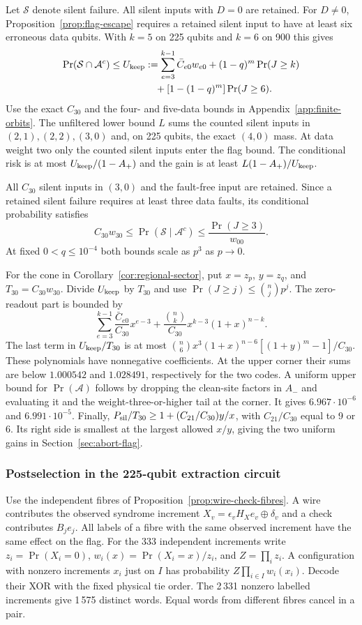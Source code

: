 \documentclass[10pt,twocolumn]{article}
\theoremstyle{definition}
\begin{document}
Let $\mathcal S$ denote silent failure. All silent inputs with
$D=0$ are retained. For $D\ne0$, Proposition~\ref{prop:flag-escape}
requires a retained silent input to have at least six erroneous data
qubits. With $k=5$ on 225 qubits and $k=6$ on 900 this gives
\begin{align*}
 \Pr(\mathcal S\cap\mathcal A^c)\le U_{\rm keep}
 &:=\sum_{e=3}^{k-1}\bar C_{e0}w_{e0}
       +(1-q)^m\Pr(J\ge k)\\
 &\quad+[1-(1-q)^m]\Pr(J\ge6).
\end{align*}
Use the exact $C_{30}$ and the four- and five-data bounds in
Appendix~\ref{app:finite-orbits}. The unfiltered lower bound $L$
sums the counted silent inputs in $(2,1),(2,2),(3,0)$ and, on 225
qubits, the exact $(4,0)$ mass. At data weight two only the counted
silent inputs enter the flag bound. The conditional risk is at most
$U_{\rm keep}/(1-A_+)$ and the gain is at least $L(1-A_+)/U_{\rm keep}$.

All $C_{30}$ silent inputs in $(3,0)$ and the fault-free input are
retained. Since a retained silent failure requires at least three
data faults, its conditional probability satisfies
\[
 C_{30}w_{30}\le\Pr(\mathcal S\mid\mathcal A^c)
 \le\frac{\Pr(J\ge3)}{w_{00}}.
\]
At fixed $0<q\le10^{-4}$ both bounds scale as $p^3$ as $p\to0$.

For the cone in Corollary~\ref{cor:regional-sector}, put $x=z_p$,
$y=z_q$, and $T_{30}=C_{30}w_{30}$. Divide $U_{\rm keep}$ by $T_{30}$
and use $\Pr(J\ge j)\le\binom njp^j$. The zero-readout part is bounded by
\[
 \sum_{e=3}^{k-1}\frac{\bar C_{e0}}{C_{30}}x^{e-3}
 +\frac{\binom nk}{C_{30}}x^{k-3}(1+x)^{n-k}.
\]
The last term in $U_{\rm keep}/T_{30}$ is at most
$\binom n6 x^3(1+x)^{n-6}[(1+y)^m-1]/C_{30}$.
These polynomials have nonnegative coefficients. At the upper corner
their sums are below $1.000542$ and $1.028491$, respectively for
the two codes. A uniform upper bound for $\Pr(\mathcal A)$ follows by
dropping the clean-site factors in $A_-$ and evaluating it and the
weight-three-or-higher tail at the corner. It gives $6.967\cdot10^{-6}$
and $6.991\cdot10^{-5}$. Finally,
$P_{\rm sil}/T_{30}\ge1+(C_{21}/C_{30})y/x$, with $C_{21}/C_{30}$
equal to 9 or 6. Its right side is smallest at the largest allowed
$x/y$, giving the two uniform gains in Section~\ref{sec:abort-flag}.

\subsubsection{Postselection in the 225-qubit extraction circuit}\label{app:circuit-flag}
Use the independent fibres of Proposition~\ref{prop:wire-check-fibres}.
A wire contributes the observed syndrome increment
$X_v=\epsilon_v H_Xe_v\oplus\delta_v$ and a check contributes $B_j e_j$.
All labels of a fibre with the same observed increment have the same
effect on the flag. For the 333 independent increments write
$z_i=\Pr(X_i=0)$, $w_i(x)=\Pr(X_i=x)/z_i$, and $Z=\prod_i z_i$.
A configuration with nonzero increments $x_i$ just on $I$ has
probability $Z\prod_{i\in I}w_i(x_i)$. Decode their XOR with the fixed
physical tie order. The 2\,331 nonzero labelled increments give 1\,575
distinct words. Equal words from different fibres cancel in a pair.
\end{document}
